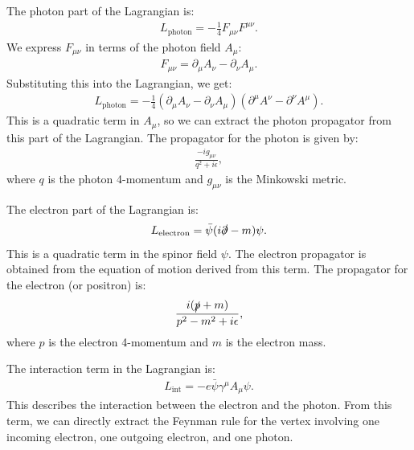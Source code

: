The photon part of the Lagrangian is:
\begin{align*}
    L_{\text{photon}} = -\frac{1}{4} F_{\mu\nu} F^{\mu\nu}.
\end{align*}
We express $F_{\mu\nu}$ in terms of the photon field $A_\mu$:
\begin{align*}
    F_{\mu\nu} = \partial_\mu A_\nu - \partial_\nu A_\mu.
\end{align*}
Substituting this into the Lagrangian, we get:
\begin{align*}
    L_{\text{photon}} = -\frac{1}{4} \left( \partial_\mu A_\nu - \partial_\nu A_\mu \right) \left( \partial^\mu A^\nu - \partial^\nu A^\mu \right). 
\end{align*}
This is a quadratic term in $A_\mu$, so we can extract the photon propagator from this part of the Lagrangian. The propagator for the photon is given by:
\begin{align}
    \frac{-i g_{\mu\nu}}{q^2 + i \epsilon},\label{eq:photon-propagator}
\end{align}
where $q$ is the photon 4-momentum and $g_{\mu\nu}$ is the Minkowski metric.

The electron part of the Lagrangian is:
\begin{align*}
    L_{\text{electron}} = \bar{\psi} (i \slashed{\partial} - m) \psi. 
\end{align*}
This is a quadratic term in the spinor field $\psi$. The electron propagator is obtained from the equation of motion derived from this term. The propagator for the electron (or positron) is:
\begin{align}
    \frac{i (\slashed{p} + m)}{p^2 - m^2 + i \epsilon}, \label{eq:electron-propagator}
\end{align}
where $p$ is the electron 4-momentum and $m$ is the electron mass.

The interaction term in the Lagrangian is:
\begin{align}
    L_{\text{int}} = - e \bar{\psi} \gamma^\mu A_\mu \psi. \label{eq:interaction-lagrangian}
\end{align}
This describes the interaction between the electron and the photon. From this term, we can directly extract the Feynman rule for the vertex involving one incoming electron, one outgoing electron, and one photon.

